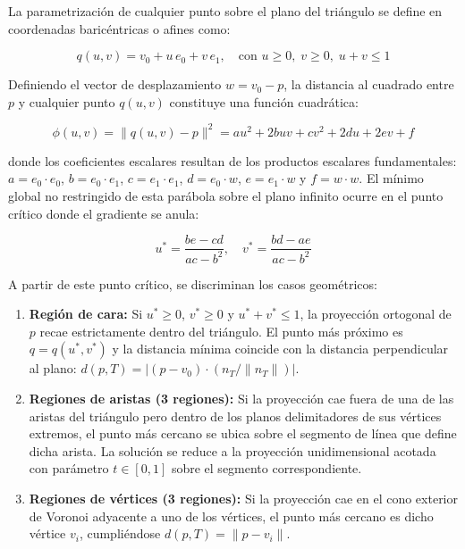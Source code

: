 La parametrización de cualquier punto sobre el plano del triángulo se define en coordenadas baricéntricas o afines como:

\begin{equation}
  q(u, v) = v_0 + u \, e_0 + v \, e_1, \quad \text{con } u \ge 0, \; v \ge 0, \; u + v \le 1
\end{equation}

Definiendo el vector de desplazamiento $w = v_0 - p$, la distancia al cuadrado entre $p$ y cualquier punto $q(u, v)$ constituye una función cuadrática:

\begin{equation}
  \phi(u, v) = \|q(u, v) - p\|^2 = a u^2 + 2 b u v + c v^2 + 2 d u + 2 e v + f
\end{equation}

donde los coeficientes escalares resultan de los productos escalares fundamentales: $a = e_0 \cdot e_0$, $b = e_0 \cdot e_1$, $c = e_1 \cdot e_1$, $d = e_0 \cdot w$, $e = e_1 \cdot w$ y $f = w \cdot w$. El mínimo global no restringido de esta parábola sobre el plano infinito ocurre en el punto crítico donde el gradiente se anula:

\begin{equation}
  u^* = \frac{b e - c d}{a c - b^2}, \quad v^* = \frac{b d - a e}{a c - b^2}
\end{equation}

A partir de este punto crítico, se discriminan los casos geométricos:

\begin{enumerate}
  \item \textbf{Región de cara:} Si $u^* \ge 0$, $v^* \ge 0$ y $u^* + v^* \le 1$, la proyección ortogonal de $p$ recae estrictamente dentro del triángulo. El punto más próximo es $q = q(u^*, v^*)$ y la distancia mínima coincide con la distancia perpendicular al plano: $d(p, T) = |(p - v_0) \cdot (n_T / \|n_T\|)|$.
  \item \textbf{Regiones de aristas (3 regiones):} Si la proyección cae fuera de una de las aristas del triángulo pero dentro de los planos delimitadores de sus vértices extremos, el punto más cercano se ubica sobre el segmento de línea que define dicha arista. La solución se reduce a la proyección unidimensional acotada con parámetro $t \in [0, 1]$ sobre el segmento correspondiente.
  \item \textbf{Regiones de vértices (3 regiones):} Si la proyección cae en el cono exterior de Voronoi adyacente a uno de los vértices, el punto más cercano es dicho vértice $v_i$, cumpliéndose $d(p, T) = \|p - v_i\|$.
\end{enumerate}

